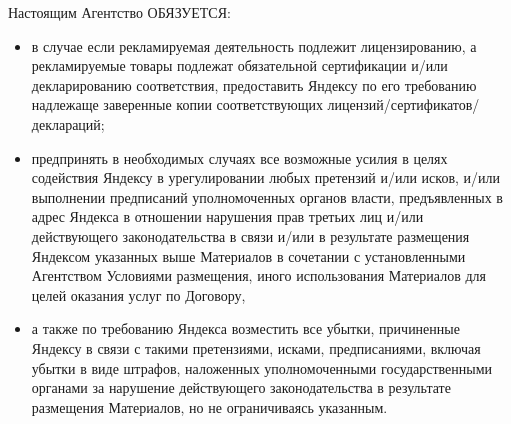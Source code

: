 \noindent
    Настоящим Агентство ОБЯЗУЕТСЯ:
\begin{itemize}
    \item в случае если рекламируемая деятельность подлежит лицензированию, а рекламируемые товары подлежат обязательной сертификации и/или декларированию соответствия, предоставить Яндексу по его требованию надлежаще заверенные копии соответствующих лицензий/сертификатов/деклараций;
    \item предпринять в необходимых случаях все возможные усилия в целях содействия Яндексу в урегулировании любых претензий и/или исков, и/или выполнении предписаний уполномоченных органов власти, предъявленных в адрес Яндекса в отношении нарушения прав третьих лиц и/или действующего законодательства в связи и/или в результате размещения Яндексом указанных выше Материалов в сочетании с установленными Агентством Условиями размещения, иного использования Материалов для целей оказания услуг по Договору,
    \item а также по требованию Яндекса возместить все убытки, причиненные Яндексу в связи с такими претензиями, исками, предписаниями, включая убытки в виде штрафов, наложенных уполномоченными государственными органами за нарушение действующего законодательства в результате размещения Материалов, но не ограничиваясь указанным.
\end{itemize}

